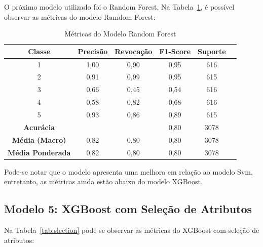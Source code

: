 \documentclass[12pt,oneside,a4paper,chapter=TITLE,
			   english,brazil]{abntex2}
\begin{document}
 O próximo modelo utilizado foi o Random Forest, Na Tabela~\ref{tab:forest}, é possível observar as métricas do modelo  Ramdom Forest: 


 \begin{table}[H]
    \centering
    \caption[Métricas do Modelo Random Forest ]{Métricas do Modelo Random Forest}
    \begin{tabular}{cccccc}
        \toprule
        \textbf{Classe} & \textbf{Precisão} & \textbf{Revocação} & \textbf{F1-Score} & \textbf{Suporte} \\
        \midrule
        1 & 1,00 & 0,90 & 0,95 & 616 \\
        2 & 0,91 & 0,99 & 0,95 & 615 \\
        3 & 0,66 & 0,45 & 0,54 & 616 \\
        4 & 0,58 & 0,82 & 0,68 & 616 \\
        5 & 0,93 & 0,86 & 0,89 & 615 \\
        \midrule
        \textbf{Acurácia} & & & 0,80 & 3078 \\
        \textbf{Média (Macro)} & 0,82 & 0,80 & 0,80 & 3078 \\
        \textbf{Média Ponderada} & 0,82 & 0,80 & 0,80 & 3078 \\
        \bottomrule
    \end{tabular}
    \label{tab:forest}
\end{table}
 \begin{flushleft}
\vspace{-1.0em}
\centering
{}
\end{flushleft}

 Pode-se notar que o modelo apresenta uma melhora em relação ao modelo Svm, entretanto, as métricas ainda estão abaixo do modelo XGBoost.


\vspace{\onelineskip}
\subsection{Modelo 5: XGBoost com Seleção de Atributos}
\vspace{\onelineskip}

 
  Na Tabela~\ref{tab:slection}  pode-se observar as métricas do XGBoost  com seleção de atributos:
\end{document}
